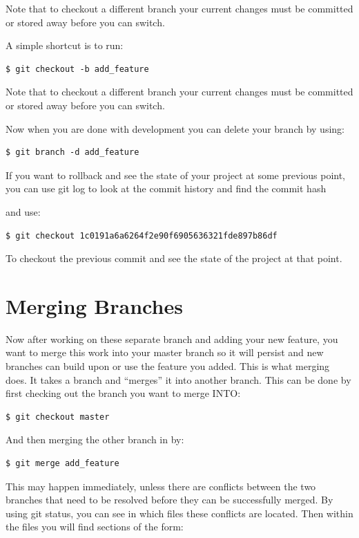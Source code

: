 \documentclass{amsart}
\begin{document}
Note that to checkout a different branch your current changes must be committed or stored away before you can switch.

A simple shortcut is to run:

\begin{verbatim}
$ git checkout -b add_feature
\end{verbatim}	

Note that to checkout a different branch your current changes must be committed or stored away before you can switch.

Now when you are done with development you can delete your branch by using:

\begin{verbatim}
$ git branch -d add_feature
\end{verbatim}	

If you want to rollback and see the state of your project at some previous point, you can use git log to look at the commit history and find the commit hash 

 

and use:

\begin{verbatim}
$ git checkout 1c0191a6a6264f2e90f6905636321fde897b86df
\end{verbatim}	

To checkout the previous commit and see the state of the project at that point.

\section*{Merging Branches}

Now after working on these separate branch and adding your new feature, you want to merge this work into your master branch so it will persist and new branches can build upon or use the feature you added.  This is what merging does.  It takes a branch and “merges” it into another branch.  This can be done by first checking out the branch you want to merge INTO:

\begin{verbatim}
$ git checkout master
\end{verbatim}	

And then merging the other branch in by:

\begin{verbatim}
$ git merge add_feature
\end{verbatim}	
This may happen immediately, unless there are conflicts between the two branches that need to be resolved before they can be successfully merged.  By using git status, you can see in which files these conflicts are located.  Then within the files you will find sections of the form:
\end{document}
